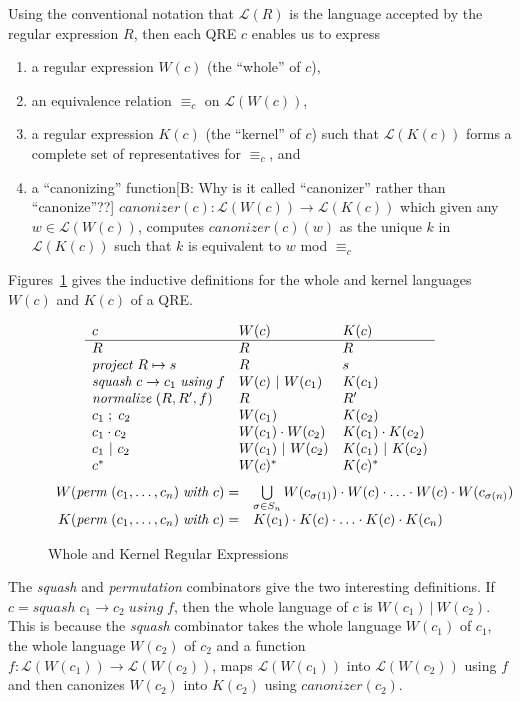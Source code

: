 \documentclass[acmsmall,review,anonymous]{acmart}
\newcommand{\FINISH}[3]{\ifdraft\textcolor{#1}{[#2: #3]}\fi}
\newcommand{\bcp}[1]{\FINISH{dkred}{B}{#1}}
\newcommand{\kw}[1]{\ensuremath{\mathit{#1}}}
\newcommand{\project}[2]{\ensuremath{\kw{project} \; #1 \mapsto #2}}
\newcommand{\squash}[3]{\ensuremath{\kw{squash} \; #1 \rightarrow #2\; \kw{using} \; #3}}
\newcommand{\perm}[2]{\ensuremath{\kw{perm}\; (#1)\; \kw{with}\; #2}}
\newcommand{\normalize}[3]{\ensuremath{\kw{normalize} \; (#1, #2, #3)}}
\newcommand{\sep}{\ensuremath{\ | \ }}
\newcommand{\canonizer}{\ensuremath{\kw{canonizer}}}
\newcommand{\eqrel}[1]{\ensuremath{\equiv_{#1}}}
\begin{document}
Using the conventional notation that $\mathcal{L}(R)$ is the language accepted
by the regular expression $R$, then each QRE $c$ enables us to express
\begin{enumerate}
  \item a regular expression $W(c)$ (the ``whole'' of $c$),
  \item an equivalence relation $\eqrel{c}$ on $\mathcal{L}(W(c))$,
  \item a regular expression $K(c)$ (the ``kernel'' of $c$)
  such that $\mathcal{L}(K(c))$ forms a complete set of representatives for
  $\eqrel{c}$, and
  \item a ``canonizing'' function\bcp{Why is it called ``canonizer'' rather
    than ``canonize''??} $\canonizer(c):\mathcal{L}(W(c))
  \longrightarrow \mathcal{L}(K(c))$ which given any $w \in \mathcal{L}(W(c))$,
  computes $\canonizer(c)(w)$ as the unique $k$ in $\mathcal{L}(K(c))$ such that
  $k$ is equivalent to $w$ mod $\eqrel{c}$
\end{enumerate}
Figures~\ref{fig:wk} gives the inductive definitions for the whole and
kernel languages $W(c)$ and $K(c)$ of a QRE.
\begin{figure}[t]
\centering
\[
\begin{array}{l@{\quad}l@{\quad}l}

c & W(c) & K(c) \\ \hline
R & R & R \\
\project{R}{s} & R & s \\
\squash{c}{c_1}{f} & W(c) \sep W(c_1) & K(c_1) \\
\normalize{R}{R'}{f} & R & R' \\
c_1 \; ; \; c_2 & W(c_1) & K(c_2) \\
c_1 \cdot c_2 & W(c_1) \cdot W(c_2) & K(c_1) \cdot K(c_2) \\
c_1 \sep c_2 & W(c_1) \sep W(c_2) & K(c_1) \sep K(c_2) \\
c^* & W(c)^* & K(c)^* \\
\end{array}
\]
\[
\begin{array}{r@{\quad}l}
W( \perm{c_1, \ldots, c_n}{c} ) = &
\bigcup \limits_{\sigma \in S_n} W(c_{\sigma(1)}) \cdot W(c) \cdot \ldots \cdot
W(c) \cdot W(c_{\sigma(n)})\\
K( \perm{c_1, \ldots, c_n}{c} ) = & K(c_1) \cdot K(c) \cdot \ldots \cdot K(c)
\cdot K(c_n)
\end{array}
\]
\caption{Whole and Kernel Regular Expressions}
\label{fig:wk}
\end{figure}
The \textit{squash} and \textit{permutation} combinators give the two
interesting definitions. If $c = \squash{c_1}{c_2}{f}$, then the whole language
of $c$ is $W(c_1) \sep W(c_2)$. This is because the \textit{squash} combinator
takes the whole language $W(c_1)$ of $c_1$, the whole language $W(c_2)$ of $c_2$
and a function $f : \mathcal{L}(W(c_1)) \longrightarrow \mathcal{L}(W(c_2))$,
maps $\mathcal{L}(W(c_1))$ into $\mathcal{L}(W(c_2))$ using $f$ and then
canonizes $W(c_2)$ into $K(c_2)$ using $\canonizer(c_2)$.
\end{document}
